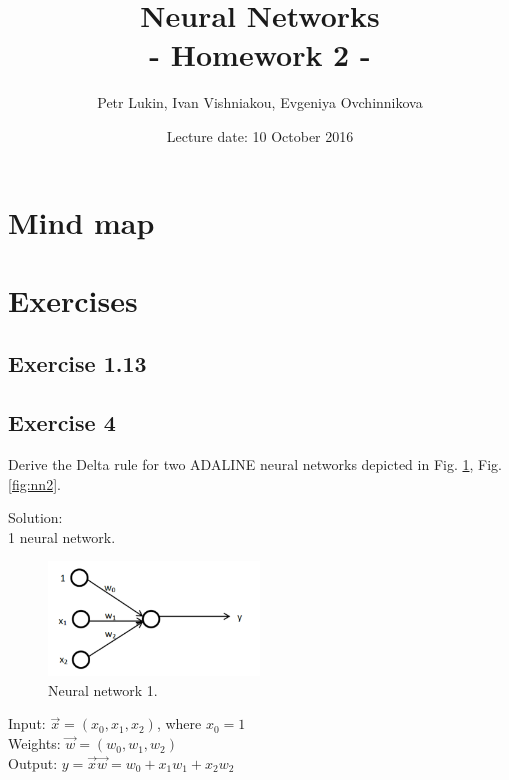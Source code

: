 \documentclass[a4paper, 12pt]{article}
\title{Neural Networks  \\
				- Homework 2 -}
\author{Petr Lukin, Ivan Vishniakou, Evgeniya Ovchinnikova}
\date{Lecture date: 10 October 2016}
\begin{document}
\maketitle

\section{Mind map}


\section{Exercises}

\subsection{Exercise 1.13}

\subsection{Exercise 4}

Derive the Delta rule for two ADALINE neural networks depicted in Fig. \ref{fig:nn1}, Fig. \ref{fig:nn2}.

Solution:\\

1 neural network.\\

\begin{figure}[h]
  \centering
  \caption{Neural network 1. \label{fig:nn1}}
  \includegraphics[width=0.5\textwidth]{nn1}
\end{figure}

Input: 	$\vec{x} = (x_0, x_1, x_2)$,  where $x_0 = 1$\\
Weights: 	$\vec{w} = (w_0, w_1, w_2)$\\
Output: $y = \vec{x} \vec{w} = w_0 + x_1w_1 + x_2w_2$\\
\end{document}
